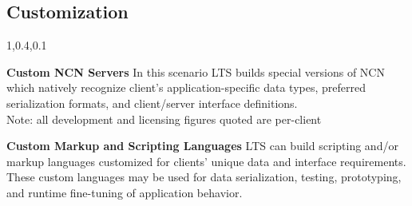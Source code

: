 
\begin{frame}{}
\section{Customization}
\vspace{-1em}	

{\Large{}\selectfont
\hspace*{-20pt}\begin{minipage}{1.08\textwidth}
\vspace{-4pt}


		
\begin{lightquadblockc}{1,0.4,0.1}{\parbox{24cm}{\centering \vspace{13pt}\color[rgb]{0,0,0}{This slide will identify how LTS may customize NA3 components for 
individual clients} \color[rgb]{0.3,0,0.1}{(dollar figures 
project average custom development 
and licensing fees)}\vspace{8pt}}}
\hspace{-4pt}\begin{minipage}{1.07\textwidth}
{\LARGE \setlength{\leftmargini}{30pt}\begin{enumerate}
\dmitem \textbf{Custom NCN Servers} \hspace{.5em} 
In this scenario LTS builds special versions of 
NCN which natively recognize client's application-specific 
data types, preferred serialization formats, 
and client/server interface definitions. 
{\color[rgb]{0.3,0,0.1}{(dev: \$75K; licensing: \$10K/month)}}\\
\hspace{-7pt}\raisebox{4pt}{\MySquare{}}\hspace{2pt}
{\selectfont Note: all development and licensing figures 
quoted are per-client}\vspace{12pt}


\dmitem \textbf{Custom Markup and Scripting Languages}  \hspace{.5em} 
LTS can build scripting and/or markup languages 
customized for clients' unique data and interface 
requirements.  These custom languages may be used 
for data serialization, testing, prototyping, 
and runtime fine-tuning of application behavior.
{\color[rgb]{0.3,0,0.1}{(dev: \$250K; licensing: \$10K/month)}}\vspace{12pt}


\end{enumerate}}
\end{minipage}
\end{lightquadblockc}
\end{minipage}}
\end{frame}
